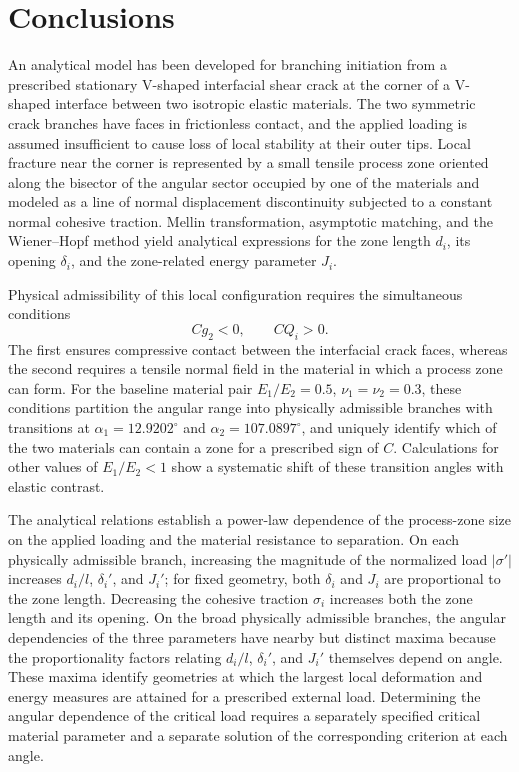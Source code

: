 \section{Conclusions}
\label{sec:conclusions}

An analytical model has been developed for branching initiation from a
prescribed stationary V-shaped interfacial shear crack at the corner of a
V-shaped interface between two isotropic elastic materials. The two symmetric
crack branches have faces in frictionless contact, and the applied loading is
assumed insufficient to cause loss of local stability at their outer tips.
Local fracture near the corner is represented by a small tensile process zone
oriented along the bisector of the angular sector occupied by one of the
materials and modeled as a line of normal displacement discontinuity subjected
to a constant normal cohesive traction. Mellin transformation, asymptotic matching, and the Wiener--Hopf method yield
analytical expressions for the zone length $d_i$, its opening $\delta_i$,
and the zone-related energy parameter $J_i$.

Physical admissibility of this local configuration requires the simultaneous
conditions
\begin{equation*}
  Cg_2<0,\qquad CQ_i>0.
\end{equation*}
The first ensures compressive contact between the interfacial crack faces,
whereas the second requires a tensile normal field in the material in which a
process zone can form. For the baseline material pair
$E_1/E_2=0.5$, $\nu_1=\nu_2=0.3$, these conditions partition the angular
range into physically admissible branches with transitions at
$\alpha_1=12.9202^\circ$ and $\alpha_2=107.0897^\circ$, and uniquely
identify which of the two materials can contain a zone for a prescribed sign
of $C$. Calculations for other values of $E_1/E_2<1$ show a systematic shift
of these transition angles with elastic contrast.

The analytical relations establish a power-law dependence of the process-zone
size on the applied loading and the material resistance to separation. On each physically admissible branch, increasing the magnitude of the
normalized load $|\sigma'|$ increases $d_i/l$, $\delta_i'$, and $J_i'$; for fixed geometry, both $\delta_i$ and $J_i$ are proportional to
the zone length. Decreasing the cohesive traction $\sigma_i$ increases both
the zone length and its opening. On the broad physically admissible branches,
the angular dependencies of the three parameters have nearby but distinct
maxima because the proportionality factors relating $d_i/l$, $\delta_i'$,
and $J_i'$ themselves depend on angle. These maxima identify geometries at
which the largest local deformation and energy measures are attained for a
prescribed external load. Determining the angular dependence of the critical
load requires a separately specified critical material parameter and a
separate solution of the corresponding criterion at each angle.

